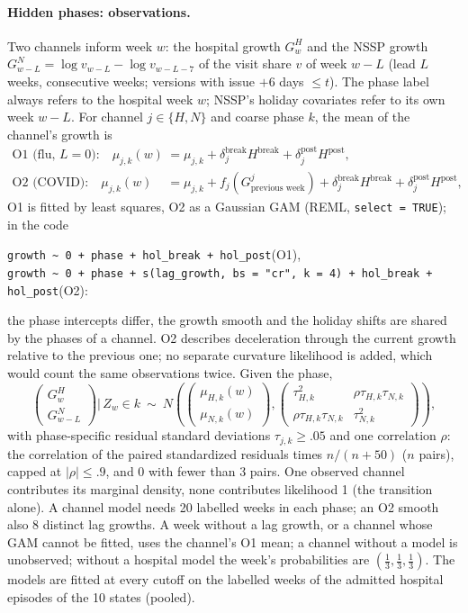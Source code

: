 \documentclass[11pt,a4paper]{article}
\theoremstyle{definition}
\theoremstyle{remark}
\begin{document}
\paragraph{Hidden phases: observations.}
Two channels inform week $w$: the hospital growth $G^H_w$ and the NSSP
growth $G^N_{w-L}=\log v_{w-L}-\log v_{w-L-7}$ of the visit share $v$ of
week $w-L$ (lead $L$ weeks, consecutive weeks; versions with issue
$+6$ days $\le t$). The phase label always refers to the hospital week $w$;
NSSP's holiday covariates refer to its own week $w-L$. For channel
$j\in\{H,N\}$ and coarse phase $k$, the mean of the channel's growth is
\begin{align*}
 \text{O1 (flu, }L=0\text{):}\quad
 \mu_{j,k}(w)&=\mu_{j,k}+\delta_{j}^{\mathrm{break}}H^{\mathrm{break}}
 +\delta_{j}^{\mathrm{post}}H^{\mathrm{post}},\\
 \text{O2 (COVID):}\quad
 \mu_{j,k}(w)&=\mu_{j,k}+f_j(G^j_{\text{previous week}})
 +\delta_{j}^{\mathrm{break}}H^{\mathrm{break}}
 +\delta_{j}^{\mathrm{post}}H^{\mathrm{post}},
\end{align*}
O1 is fitted by least squares, O2 as a Gaussian GAM (REML,
\texttt{select = TRUE}); in the code
\begin{center}\small
\texttt{growth \textasciitilde{} 0 + phase + hol\_break + hol\_post}\quad(O1),\\
\texttt{growth \textasciitilde{} 0 + phase + s(lag\_growth, bs = "cr", k = 4) +
hol\_break + hol\_post}\quad(O2):
\end{center}
the phase intercepts differ, the growth smooth and the holiday shifts are
shared by the phases of a channel. O2 describes deceleration through the current growth relative to
the previous one; no separate curvature likelihood is added, which would
count the same observations twice. Given the phase,
\[
 \begin{pmatrix}G^H_w\\G^N_{w-L}\end{pmatrix}\Big|\,Z_w\in k\ \sim\
 N\!\left(\begin{pmatrix}\mu_{H,k}(w)\\\mu_{N,k}(w)\end{pmatrix},
 \begin{pmatrix}\tau_{H,k}^2&\rho\tau_{H,k}\tau_{N,k}\\
 \rho\tau_{H,k}\tau_{N,k}&\tau_{N,k}^2\end{pmatrix}\right),
\]
with phase-specific residual standard deviations $\tau_{j,k}\ge.05$ and one
correlation $\rho$: the correlation of the paired standardized residuals
times $n/(n+50)$ ($n$ pairs), capped at $|\rho|\le.9$, and $0$ with fewer
than 3 pairs. One observed channel contributes its marginal density, none
contributes likelihood 1 (the transition alone). A channel model needs 20
labelled weeks in each phase; an O2 smooth also 8 distinct lag growths. A
week without a lag growth, or a channel whose GAM cannot be fitted, uses the
channel's O1 mean; a channel without a model is unobserved; without a
hospital model the week's probabilities are $(\frac13,\frac13,\frac13)$.
The models are fitted at every cutoff on the labelled weeks of the admitted
hospital episodes of the 10 states (pooled).
\end{document}
